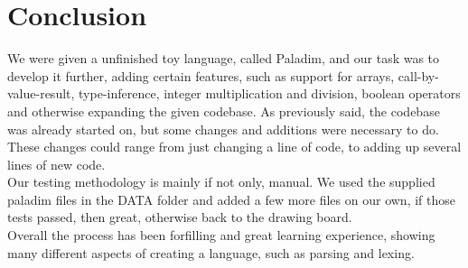 \section{Conclusion}
We were given a unfinished toy language, called Paladim, and our task was to
develop it further, adding certain features, such as support for arrays,
call-by-value-result, type-inference, integer multiplication and division,
boolean operators and otherwise expanding the given codebase. As previously said,
the codebase was already started on, but some changes and additions were
necessary to do.
These changes could range from just changing a line of code, to adding up
several lines of new code.\\
Our testing methodology is mainly if not only, manual. We used the supplied
paladim files in the DATA folder and added a few more files on our own, if those
tests passed, then great, otherwise back to the drawing board.\\
Overall the process has been forfilling and great learning experience, showing
many different aspects of creating a language, such as parsing and lexing.\\

